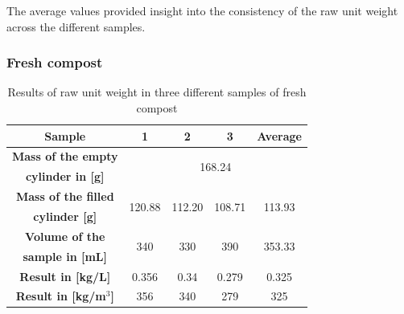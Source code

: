 \documentclass{article}
\begin{document}
The average values provided insight into the consistency of the raw
unit weight across the different samples.

\subsubsection{Fresh compost}
\renewcommand{\arraystretch}{1.5}
\begin{table}[ht!]
    \centering \vspace{.3cm}
    \caption{Results of raw unit weight in three different samples of fresh compost}
    \begin{tabular}{|c|c|c|c|c|}
        \hline
        \textbf{Sample} & \textbf{1} & \textbf{2} & \textbf{3} & \textbf{Average}\\
        \hline
        {\textbf{Mass of the empty}} & \multicolumn{4}{c|}{\multirow{2}{*}{168.24}}\\
        \textbf{cylinder in [g]} & \multicolumn{4}{c|}{}\\
        \hline
        \textbf{Mass of the filled} & \multirow{2}{*}{120.88} & \multirow{2}{*}{112.20} & \multirow{2}{*}{108.71} & \multirow{2}{*}{113.93}\\
        \textbf{cylinder [g]} & & & &\\
        \hline
        \textbf{Volume of the} & \multirow{2}{*}{340} & \multirow{2}{*}{330} & \multirow{2}{*}{390} & \multirow{2}{*}{353.33}\\
        \textbf{sample in [mL]} & & & &\\
        \hline
        \textbf{Result in [kg/L]} & 0.356 & 0.34 & 0.279 & 0.325\\
        \hline
        \textbf{Result in [kg/m$^3$]} & 356 & 340 & 279 & 325\\
        \hline
    \end{tabular}
\end{table}

\newpage
\end{document}
